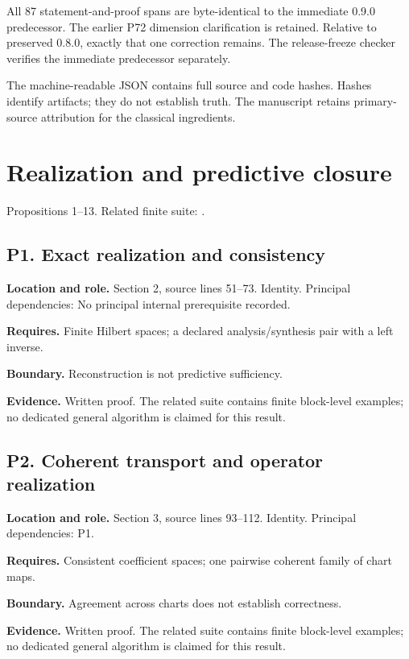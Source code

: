 \documentclass[11pt,oneside,openany]{book}
\numberwithin{equation}{section}
\begin{document}
All 87 statement-and-proof spans are byte-identical to the immediate
0.9.0 predecessor. The earlier P72 dimension clarification is retained.
Relative to preserved 0.8.0, exactly that one correction remains. The
release-freeze checker verifies the immediate predecessor separately.

The machine-readable JSON contains full source and code hashes. Hashes
identify artifacts; they do not establish truth. The manuscript retains
primary-source attribution for the classical ingredients.


\section{Realization and predictive
closure}\label{LSMRegister:realization-and-predictive-closure}

Propositions 1--13. Related finite suite:
.

\par\noindent\begin{minipage}{\textwidth}
\subsection{P1. Exact realization and
consistency}\label{LSMRegister:p1.-exact-realization-and-consistency}

\textbf{Location and role.} Section 2, source lines 51--73. Identity.
Principal dependencies: No principal internal prerequisite recorded.

\textbf{Requires.} Finite Hilbert spaces; a declared analysis/synthesis
pair with a left inverse.

\textbf{Boundary.} Reconstruction is not predictive sufficiency.

\textbf{Evidence.} Written proof. The related suite contains finite
block-level examples; no dedicated general algorithm is claimed for this
result.
\end{minipage}\par\medskip

\par\noindent\begin{minipage}{\textwidth}
\subsection{P2. Coherent transport and operator
realization}\label{LSMRegister:p2.-coherent-transport-and-operator-realization}

\textbf{Location and role.} Section 3, source lines 93--112. Identity.
Principal dependencies: P1.

\textbf{Requires.} Consistent coefficient spaces; one pairwise coherent
family of chart maps.

\textbf{Boundary.} Agreement across charts does not establish
correctness.

\textbf{Evidence.} Written proof. The related suite contains finite
block-level examples; no dedicated general algorithm is claimed for this
result.
\end{minipage}\par\medskip
\end{document}
